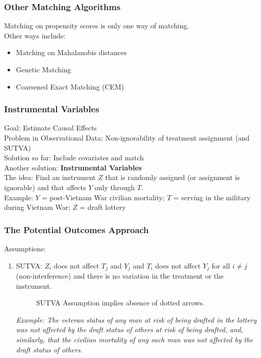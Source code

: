 \documentclass[handout]{beamer}
\begin{document}
\begin{frame}
\frametitle{Other Matching Algorithms}
\pause
Matching on propensity scores is only one way of matching. \\
\pause
\bigskip
Other ways include:
\pause
\begin{itemize}
\item Matching on Mahalanobis distances
\pause
\item Genetic Matching
\pause
\item Coarsened Exact Matching (CEM)
\end{itemize}
\end{frame}

\begin{frame}
\frametitle{Instrumental Variables}
\pause
Goal: Estimate Causal Effects\\
\bigskip
\pause
Problem in Observational Data: Non-ignorability of treatment
assignment \pause (and SUTVA) \\
\pause
\bigskip
Solution so far: Include covariates and match \\
\pause
\bigskip
Another solution: {\bf Instrumental Variables} \\
\pause
\bigskip
The idea: Find an instrument $Z$ that is randomly assigned (or
assignment is ignorable) and that affects $Y$ only through $T$. \\
\pause
\bigskip
Example: $Y$ = post-Vietnam War civilian mortality; \pause $T$ = serving in the
military during Vietnam War; \pause $Z$ = draft lottery
\end{frame}

\begin{frame}
\frametitle{The Potential Outcomes Approach}
\pause
Assumptions:
\pause
\bigskip
\begin{enumerate}
\item SUTVA:
\pause 
$Z_i$ does not affect $T_j$ and $Y_j$ and $T_i$ does not
affect $Y_j$ for all $i \neq j$ (non-interference) and there is no
variation in the treatment or the instrument.
\pause
\small
\begin{figure}[!htp]
\caption{SUTVA Assumption implies absence of dotted arrows.}
\centerline{
}
\end{figure}
\pause
\bigskip
\tiny
{\it Example: The veteran status of any man at risk of being drafted
in the lottery was not affected by the draft status of others at risk
of being drafted, and, similarly, that the civilian mortality of any
such man was not affected by the draft status of others.}
\normalsize
\end{enumerate}
\end{frame}
\end{document}
